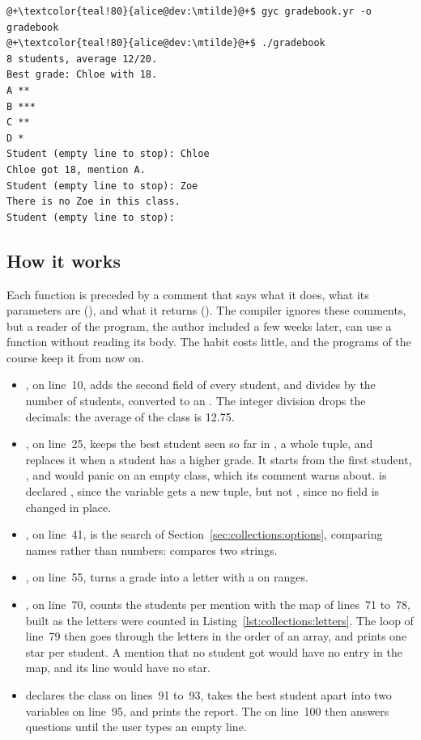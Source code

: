 
\vspace{-10pt}%
\begin{lstlisting}[style=bashVerb, escapechar=@+]
@+\textcolor{teal!80}{alice@dev:\mtilde}@+$ gyc gradebook.yr -o gradebook
@+\textcolor{teal!80}{alice@dev:\mtilde}@+$ ./gradebook
8 students, average 12/20.
Best grade: Chloe with 18.
A **
B ***
C **
D *
Student (empty line to stop): Chloe
Chloe got 18, mention A.
Student (empty line to stop): Zoe
There is no Zoe in this class.
Student (empty line to stop):
\end{lstlisting}

\subsection{How it works}

Each function is preceded by a comment that says what it does, what its
parameters are (), and what it returns (). The
compiler ignores these comments, but a reader of the program, the author
included a few weeks later, can use a function without reading its body. The
habit costs little, and the programs of the course keep it from now on.

\begin{itemize}
\item {}, on line~10, adds the second field of every student, and
  divides by the number of students, converted to an . The integer
  division drops the decimals: the average of the class is 12.75.
\item {}, on line~25, keeps the best student seen so far in
  , a whole tuple, and replaces it when a student has a higher grade.
  It starts from the first student, , and would panic on an
  empty class, which its comment warns about.  is declared
  , since the variable gets a new tuple, but not , since
  no field is changed in place.
\item {}, on line~41, is the search of
  Section~\ref{sec:collections:options}, comparing names rather than numbers:
   compares two strings.
\item {}, on line~55, turns a grade into a letter with a
   on ranges.
\item {}, on line~70, counts the students per mention with
  the map of lines~71 to~78, built as the letters were counted in
  Listing~\ref{lst:collections:letters}. The loop of line~79 then goes through
  the letters in the order of an array, and prints one star per student. A
  mention that no student got would have no entry in the map, and its line
  would have no star.
\item {} declares the class on lines~91 to~93, takes the best
  student apart into two variables on line~95, and prints the report. The
   on line~100 then answers questions until the user types an empty
  line.
\end{itemize}

